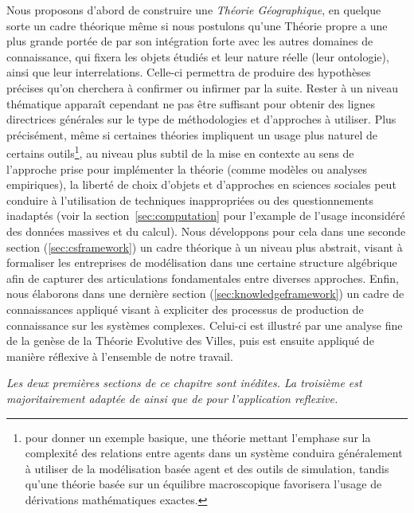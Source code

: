 {Nous proposons d'abord de construire une \emph{Théorie Géographique}, en quelque sorte un cadre théorique même si nous postulons qu'une Théorie propre a une plus grande portée de par son intégration forte avec les autres domaines de connaissance, qui fixera les objets étudiés et leur nature réelle (leur ontologie), ainsi que leur interrelations. Celle-ci permettra de produire des hypothèses précises qu'on cherchera à confirmer ou infirmer par la suite. Rester à un niveau thématique apparaît cependant ne pas être suffisant pour obtenir des lignes directrices générales sur le type de méthodologies et d'approches à utiliser. Plus précisément, même si certaines théories impliquent un usage plus naturel de certains outils\footnote{pour donner un exemple basique, une théorie mettant l'emphase sur la complexité des relations entre agents dans un système conduira généralement à utiliser de la modélisation basée agent et des outils de simulation, tandis qu'une théorie basée sur un équilibre macroscopique favorisera l'usage de dérivations mathématiques exactes.}, au niveau plus subtil de la mise en contexte au sens de l'approche prise pour implémenter la théorie (comme modèles ou analyses empiriques), la liberté de choix d'objets et d'approches en sciences sociales peut conduire à l'utilisation de techniques inappropriées ou des questionnements inadaptés (voir la section~\ref{sec:computation} pour l'example de l'usage inconsidéré des données massives et du calcul). Nous développons pour cela dans une seconde section (\ref{sec:csframework}) un cadre théorique à un niveau plus abstrait, visant à formaliser les entreprises de modélisation dans une certaine structure algébrique afin de capturer des articulations fondamentales entre diverses approches. Enfin, nous élaborons dans une dernière section (\ref{sec:knowledgeframework}) un cadre de connaissances appliqué visant à expliciter des processus de production de connaissance sur les systèmes complexes. Celui-ci est illustré par une analyse fine de la genèse de la Théorie Evolutive des Villes, puis est ensuite appliqué de manière réflexive à l'ensemble de notre travail.
}








\stars

\textit{Les deux premières sections de ce chapitre sont inédites. La troisième est majoritairement adaptée de \cite{raimbault2017knowledge} ainsi que de \cite{raimbault2017co} pour l'application reflexive.}







